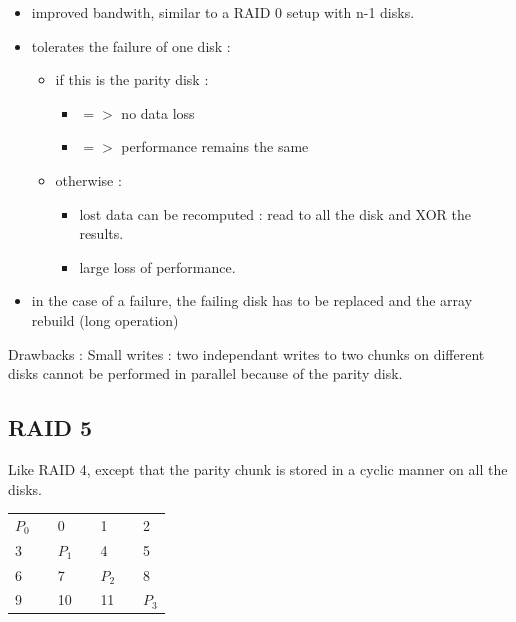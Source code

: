 \begin{itemize}
  \item improved bandwith, similar to a RAID 0 setup with n-1 disks.
  \item tolerates the failure of one disk :
  \begin{itemize}
    \item if this is the parity disk :
    \begin{itemize}
      \item $=>$ no data loss
      \item $=>$ performance remains the same
    \end{itemize}
    \item otherwise :
    \begin{itemize}
      \item lost data can be recomputed : read to all the disk and XOR the results.
      \item large loss of performance.
    \end{itemize}
  \end{itemize}
  \item in the case of a failure, the failing disk has to be replaced and the array rebuild (long operation)
\end{itemize}

Drawbacks :
Small writes : two independant writes to two chunks on different disks cannot be performed in parallel because of the parity disk.

\subsection{RAID 5}

Like RAID 4, except that the parity chunk is stored in a cyclic manner on all the disks.
\begin{center}
\begin{table}[h]
\begin{tabular}{|l|l|l|l|l|l|l|}
\cline{1-1} \cline{3-3} \cline{5-5} \cline{7-7}
$P_0$ &  & 0  &  & 1  &  & 2  \\ \cline{1-1} \cline{3-3} \cline{5-5} \cline{7-7} 
3  &  & $P_1$ &  & 4  &  & 5  \\ \cline{1-1} \cline{3-3} \cline{5-5} \cline{7-7} 
6  &  & 7  &  & $P_2$ &  & 8  \\ \cline{1-1} \cline{3-3} \cline{5-5} \cline{7-7} 
9  &  & 10 &  & 11 &  & $P_3$
\end{tabular}
\end{table}
\end{center}

